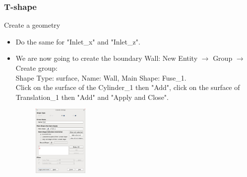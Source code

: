 \documentclass[10pt, hyperref={unicode=true,pdfusetitle, bookmarks=true,bookmarksnumbered=false,bookmarksopen=false, breaklinks=false,pdfborder={0 0 1},backref=true,colorlinks=true,linkcolor=darkblue,pageanchor}]{beamer}
\begin{document}
\begin{frame}
\frametitle{T-shape}
\begin{block}{Create a geometry}

\begin{itemize}
\item Do the same for "Inlet\_x" and "Inlet\_z".
\item We are now going to create the boundary Wall: New Entity $\rightarrow$ Group $\rightarrow$ Create group:\\
Shape Type: surface, Name: Wall, Main Shape: Fuse\_1.\\
Click on the surface of the Cylinder\_1 then "Add", click on the surface of Translation\_1 then "Add" and "Apply and Close".
\begin{figure}
\includegraphics[width=0.25\textwidth]{PICTURES/salome16.jpg}
\end{figure}
\end{itemize}

\end{block}
\end{frame}
\end{document}
